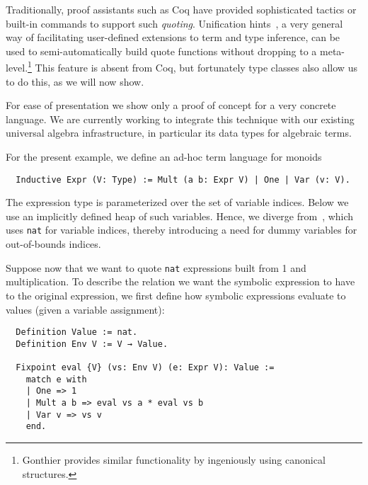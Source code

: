 \documentclass[a4paper,10pt,runningheads]{llncs}
\begin{document}
Traditionally, proof assistants such as Coq have provided sophisticated tactics or built-in commands to support such \emph{quoting}. Unification hints~\cite{Hints}, a very general way of facilitating user-defined extensions to term and type inference, can be used to semi-automatically build quote functions without dropping to a meta-level.\footnote{Gonthier provides similar functionality by ingeniously using canonical structures.} This feature is absent from Coq, but fortunately type classes also allow us to do this, as we will now show.

For ease of presentation we show only a proof of concept for a very concrete language. We are currently working to integrate this technique with our existing universal algebra infrastructure, in particular its data types for algebraic terms.%

For the present example, we define an ad-hoc term language for monoids
\begin{lstlisting}
  Inductive Expr (V: Type) := Mult (a b: Expr V) | One | Var (v: V).
\end{lstlisting}
The expression type is parameterized over the set of variable indices. Below we use an implicitly defined heap of such variables. Hence, we diverge from~\cite{Hints}, which uses \lstinline|nat| for variable indices, thereby introducing a need for dummy variables for out-of-bounds indices.

Suppose now that we want to quote \lstinline|nat| expressions built from 1 and multiplication. To describe the relation we want the symbolic expression to have to the original expression, we first define how symbolic expressions evaluate to values (given a variable assignment):
\begin{lstlisting}
  Definition Value := nat.
  Definition Env V := V → Value.

  Fixpoint eval {V} (vs: Env V) (e: Expr V): Value :=
    match e with
    | One => 1
    | Mult a b => eval vs a * eval vs b
    | Var v => vs v
    end.
\end{lstlisting}

\end{document}
